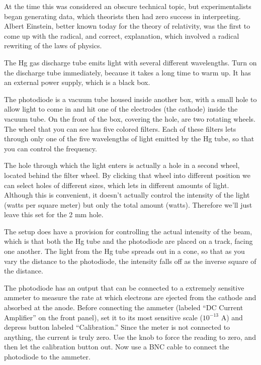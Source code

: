 At the time this was considered an obscure technical topic, but experimentalists
began generating data, which theorists then had zero success in interpreting.
Albert Einstein,
better known today for the theory of relativity, was the
first to come up with the radical, and correct, explanation,
which involved a radical rewriting of the laws of physics.

\setup

The Hg gas discharge tube emits
light with several different wavelengths.
Turn on the discharge tube immediately, because it takes a long time to warm up.
It has an external power supply, which is a black box.

The photodiode is a vacuum tube housed inside another box, with a small hole
to allow light to come in and hit one of the electrodes (the cathode) inside the vacuum tube.
On the front of the box, covering the hole, are two rotating wheels.  The wheel
that you can see has five colored filters. Each of these filters lets through only
one of the five wavelengths of light emitted by the Hg tube, so that you can control
the frequency.

The hole through which the light enters is actually
a hole in a second wheel, located behind the filter wheel. By clicking that wheel into different position we can
select holes of different sizes, which lets in different amounts of light.
Although this is convenient, it doesn't actually control the intensity of the light (watts per square meter)
but only the total amount (watts). Therefore we'll just leave this set for the 2 mm hole.

The setup does have a provision for controlling the actual intensity of the beam, which is that both
the Hg tube and the photodiode are placed on a track, facing one another.  The light from the Hg tube
spreads out in a cone, so that as you vary the distance to the photodiode, the intensity falls off as
the inverse square of the distance.

The photodiode has an output that can be connected to a extremely sensitive ammeter to measure the
rate at which electrons are ejected from the cathode and absorbed at the anode. Before connecting the
ammeter (labeled ``DC Current Amplifier'' on the front panel), set it to its most sensitive scale
($10^{-13}$ A) and depress button labeled ``Calibration.'' Since the meter is not connected to anything,
the current is truly zero. Use the knob to force the reading to zero, and then let the calibration button out.
Now use a BNC cable to connect the photodiode to the ammeter.

